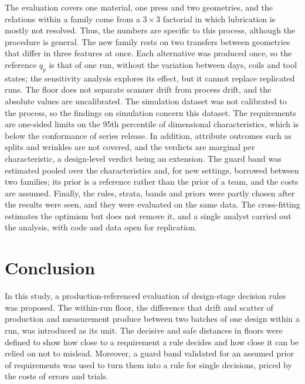 \documentclass[pdflatex,sn-basic,lineno]{sn-jnl}
\begin{document}
The evaluation covers one material, one press and two geometries, and the relations within a family come from a $3\times3$ factorial in which lubrication is mostly not resolved. Thus, the numbers are specific to this process, although the procedure is general. The new family rests on two transfers between geometries that differ in three features at once. Each alternative was produced once, so the reference $q_p$ is that of one run, without the variation between days, coils and tool states; the sensitivity analysis explores its effect, but it cannot replace replicated runs. The floor does not separate scanner drift from process drift, and the absolute values are uncalibrated. The simulation dataset was not calibrated to the process, so the findings on simulation concern this dataset. The requirements are one-sided limits on the 95th percentile of dimensional characteristics, which is below the conformance of series release. In addition, attribute outcomes such as splits and wrinkles are not covered, and the verdicts are marginal per characteristic, a design-level verdict being an extension. The guard band was estimated pooled over the characteristics and, for new settings, borrowed between two families; its prior is a reference rather than the prior of a team, and the costs are assumed. Finally, the rules, strata, bands and priors were partly chosen after the results were seen, and they were evaluated on the same data. The cross-fitting estimates the optimism but does not remove it, and a single analyst carried out the analysis, with code and data open for replication.

\section{Conclusion}\label{sec:conclusion}

In this study, a production-referenced evaluation of design-stage decision rules was proposed. The within-run floor, the difference that drift and scatter of production and measurement produce between two batches of one design within a run, was introduced as its unit. The decisive and safe distances in floors were defined to show how close to a requirement a rule decides and how close it can be relied on not to mislead. Moreover, a guard band validated for an assumed prior of requirements was used to turn them into a rule for single decisions, priced by the costs of errors and trials.
\end{document}
